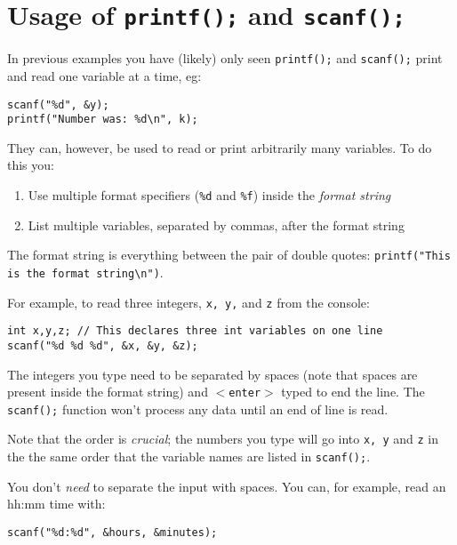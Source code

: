 \documentclass{lab}
\begin{document}
\section{Usage of \texttt{printf();} and \texttt{scanf();}}

In previous examples you have (likely) only seen \texttt{printf();} and \texttt{scanf();} print and read one variable at a time, eg:

\begin{lstlisting}[style=CStyle]
scanf("%d", &y);
printf("Number was: %d\n", k);
\end{lstlisting}

They can, however, be used to read or print arbitrarily many variables. To do this you:

\begin{enumerate}
\item Use multiple format specifiers (\texttt{\%d} and \texttt{\%f}) inside the \textit{format string}
\item List multiple variables, separated by commas, after the format string
\end{enumerate}

The format string is everything between the pair of double quotes: \texttt{printf("This is the format string\textbackslash n")}.

For example, to read three integers, \texttt{x, y,} and \texttt{z} from the console:

\begin{lstlisting}[style=CStyle]
int x,y,z; // This declares three int variables on one line
scanf("%d %d %d", &x, &y, &z);
\end{lstlisting}

The integers you type need to be separated by spaces (note that spaces are present inside the format string) and \texttt{$<$enter$>$} typed to end the line. The \texttt{scanf();} function won't process any data until an end of line is read.

Note that the order is \textit{crucial}; the numbers you type will go into \texttt{x, y} and \texttt{z} in the the same order that the variable names are listed in \texttt{scanf();}.

You don't \textit{need} to separate the input with spaces. You can, for example, read an hh:mm time with:

\begin{lstlisting}[style=CStyle]
scanf("%d:%d", &hours, &minutes);
\end{lstlisting}
\end{document}
